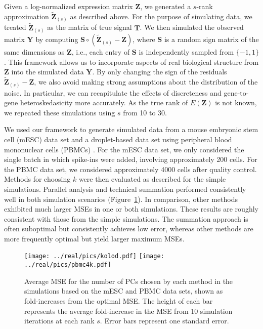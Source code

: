 \documentclass[10pt,letterpaper]{article}
\begin{document}
Given a log-normalized expression matrix $\mathbf{Z}$, we generated a $s$-rank approximation $\mathbf{\tilde Z}_{(s)}$ as described above.
For the purpose of simulating data, we treated $\mathbf{\tilde Z}_{(s)}$ as the matrix of true signal $\mathbf{T}$.
We then simulated the observed matrix $\mathbf{Y}$ by computing $\mathbf{S} \circ (\mathbf{\tilde Z}_{(s)} - \mathbf{Z})$,
where $\mathbf{S}$ is a random sign matrix of the same dimensions as $\mathbf{Z}$, i.e., each entry of $\mathbf{S}$ is independently sampled from $\{-1, 1\}$.
This framework allows us to incorporate aspects of real biological structure from $\mathbf{Z}$ into the simulated data $\mathbf{Y}$.
By only changing the sign of the residuals $\mathbf{\tilde Z}_{(s)} - \mathbf{Z}$, we also avoid making strong assumptions about the distribution of the noise.
In particular, we can recapitulate the effects of discreteness and gene-to-gene heteroskedasicity more accurately.
As the true rank of $E(\mathbf{Z})$ is not known, we repeated these simulations using $s$ from 10 to 30.


We used our framework to generate simulated data from a mouse embryonic stem cell (mESC) data set \cite{kolod2015single} and a droplet-based data set using peripheral blood mononuclear cells (PBMCs) \cite{zheng2017massively}.
For the mESC data set, we only considered the single batch in which spike-ins were added, involving approximately 200 cells.
For the PBMC data set, we considered approximately 4000 cells after quality control.
Methods for choosing $k$ were then evaluated as described for the simple simulations.
Parallel analysis and technical summation performed consistently well in both simulation scenarios (Figure~\ref{fig:real}).
In comparison, other methods exhibited much larger MSEs in one or both simulations.
These results are roughly consistent with those from the simple simulations.
The summation approach is often suboptimal but consistently achieves low error, whereas other methods are more frequently optimal but yield larger maximum MSEs.

\begin{figure}[btp]
\begin{center}
\texttt{[image: ../real/pics/kolod.pdf]}
\texttt{[image: ../real/pics/pbmc4k.pdf]}
\end{center}
\caption{Average MSE for the number of PCs chosen by each method in the simulations based on the mESC and PBMC data sets, shown as fold-increases from the optimal MSE.
The height of each bar represents the average fold-increase in the MSE from 10 simulation iterations at each rank $s$.
Error bars represent one standard error.}
\label{fig:real}
\end{figure}
\end{document}
